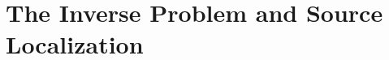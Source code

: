 \documentclass[a4paper, UKenglish, 11pt]{uiomaster}
\begin{document}


\section{The Inverse Problem and Source Localization}





\end{document}
